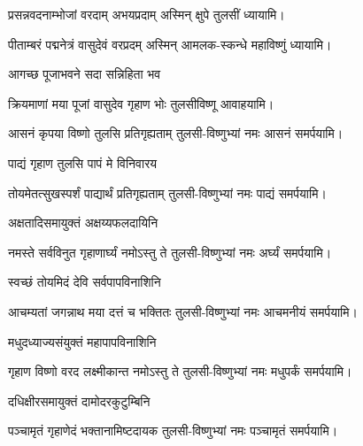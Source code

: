 \begin{center}

{प्रसन्नवदनाम्भोजां वरदाम् अभयप्रदाम्}
\hfill अस्मिन् क्षुपे तुलसीं ध्यायामि।

{पीताम्बरं पद्मनेत्रं वासुदेवं वरप्रदम्}
\hfill{}अस्मिन् आमलक-स्कन्धे महाविष्णुं ध्यायामि।

{आगच्छ पूजाभवने सदा सन्निहिता भव}

{क्रियमाणां मया पूजां वासुदेव गृहाण भोः} 
\hfill{}तुलसीविष्णू आवाहयामि।

{आसनं कृपया विष्णो तुलसि प्रतिगृह्यताम्}
\hfill{}तुलसी-विष्णुभ्यां नमः आसनं समर्पयामि।

{पाद्यं गृहाण तुलसि पापं मे विनिवारय}

{तोयमेतत्सुखस्पर्शं पाद्यार्थं प्रतिगृह्यताम्}
\hfill{}तुलसी-विष्णुभ्यां नमः पाद्यं समर्पयामि।

{अक्षतादिसमायुक्तं अक्षय्यफलदायिनि}

{नमस्ते सर्वविनुत गृहाणार्घ्यं नमोऽस्तु ते}
\hfill{} तुलसी-विष्णुभ्यां नमः अर्घ्यं समर्पयामि।

\begin{minipage}{\linewidth}

{स्वच्छं तोयमिदं देवि सर्वपापविनाशिनि}

{आचम्यतां जगन्नाथ मया दत्तं च भक्तितः}
\hfill{}तुलसी-विष्णुभ्यां नमः आचमनीयं समर्पयामि।
\end{minipage}

{मधुदध्याज्यसंयुक्तं महापापविनाशिनि}

{गृहाण विष्णो वरद लक्ष्मीकान्त नमोऽस्तु ते}
\hfill{}तुलसी-विष्णुभ्यां नमः मधुपर्कं समर्पयामि।

{दधिक्षीरसमायुक्तं दामोदरकुटुम्बिनि}

{पञ्चामृतं गृहाणेदं भक्तानामिष्टदायक}
\hfill{}तुलसी-विष्णुभ्यां नमः पञ्चामृतं समर्पयामि।


\end{center}
